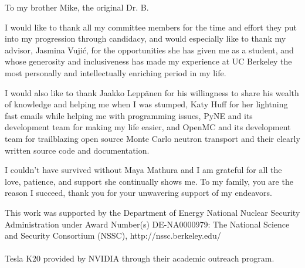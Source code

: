 \documentclass{ucbthesis}
\begin{document}
\begin{frontmatter}

\begin{dedication}
\null\vfil
\begin{center}
To my brother Mike, the original Dr. B. \\\vspace{12pt}

\end{center}
\vfil\null
\end{dedication}

\tableofcontents
\clearpage
\listoffigures
\clearpage
\listoftables

\begin{acknowledgements}

 I would like to thank all my committee members for the time and effort they put into my progression through candidacy, and would especially like to thank my advisor, Jasmina Vuji{\'c}, for the opportunities she has given me as a student, and whose generosity and inclusiveness has made my experience at UC Berkeley the most personally and intellectually enriching period in my life. 

I would also like to thank Jaakko Lepp{\"a}nen for his willingness to share his wealth of knowledge and helping me when I was stumped, Katy Huff for her lightning fast emails while helping me with programming issues, PyNE and its development team for making my life easier, and OpenMC and its development team for trailblazing open source Monte Carlo neutron transport and their clearly written source code and documentation.	  

I couldn't have survived without Maya Mathura and I am grateful for all the love, patience, and support she continually shows me.  To my family, you are the reason I succeed, thank you for your unwavering support of my endeavors.

\vfill
\noindent This work was supported by the Department of Energy National Nuclear Security Administration under Award Number(s) DE-NA0000979: The National Science and Security Consortium (NSSC), http://nssc.berkeley.edu/
\\ \\
\noindent Tesla K20 provided by NVIDIA through their academic outreach program.

\end{acknowledgements}

\end{frontmatter}

\pagestyle{headings}

\let\originaleqref\eqref
\renewcommand{\eqref}{Eq.~\originaleqref}






\begin{appendix}


\end{appendix}

\printbibliography
\end{document}
